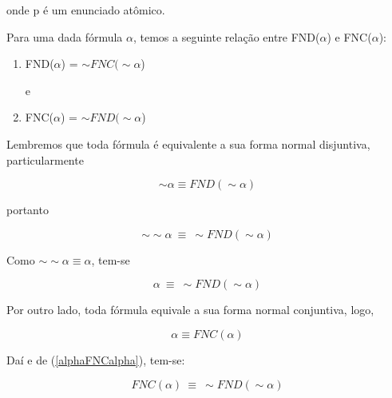 \noindent onde p é um enunciado atômico.

Para uma dada fórmula $\alpha$, temos a seguinte relação entre FND($\alpha$) e FNC($\alpha$):

\begin{enumerate}[label=\roman*)]
    \item FND($\alpha$) = $\sim FNC(\sim \alpha$)

    e

    \item FNC($\alpha$) = $\sim FND(\sim \alpha$)
\end{enumerate}

Lembremos que toda fórmula é equivalente a sua forma normal disjuntiva, particularmente

$$\sim \alpha \equiv FND(\sim \alpha)$$

portanto

$$\sim \sim \alpha\ \equiv\ \sim FND(\sim \alpha)$$

Como $\sim \sim \alpha \equiv \alpha$, tem-se

\begin{equation}\label{alphaFNCalpha}
    \alpha\ \equiv\ \sim FND(\sim \alpha) \tag{1}
\end{equation}

Por outro lado, toda fórmula equivale a sua forma normal conjuntiva, logo,

\begin{equation*}
    \alpha \equiv FNC(\alpha)
\end{equation*}

Daí e de (\ref{alphaFNCalpha}), tem-se:

\begin{equation*}
    FNC(\alpha)\ \equiv\ \sim FND(\sim \alpha)
\end{equation*}
